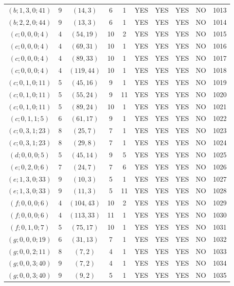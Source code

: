 \begin{longtable}{|c|c|c|c|c|c|c|c|c|c|}
$(b; 1, 3, 0; 41)$ & 9 & $(14, 3)$ & 6 & 1 & YES & YES & YES & NO & 1013\\
$(b; 2, 2, 0; 44)$ & 9 & $(13, 3)$ & 6 & 1 & YES & YES & YES & NO & 1014\\
$(c; 0, 0, 0; 4)$ & 4 & $(54, 19)$ & 10 & 2 & YES & YES & YES & NO & 1015\\
$(c; 0, 0, 0; 4)$ & 4 & $(69, 31)$ & 10 & 1 & YES & YES & YES & NO & 1016\\
$(c; 0, 0, 0; 4)$ & 4 & $(89, 33)$ & 10 & 1 & YES & YES & YES & NO & 1017\\
$(c; 0, 0, 0; 4)$ & 4 & $(119, 44)$ & 10 & 1 & YES & YES & YES & NO & 1018\\
$(c; 0, 1, 0; 11)$ & 5 & $(45, 16)$ & 9 & 1 & YES & YES & YES & NO & 1019\\
$(c; 0, 1, 0; 11)$ & 5 & $(55, 24)$ & 9 & 11 & YES & YES & YES & NO & 1020\\
$(c; 0, 1, 0; 11)$ & 5 & $(89, 24)$ & 10 & 1 & YES & YES & YES & NO & 1021\\
$(c; 0, 1, 1; 5)$ & 6 & $(61, 17)$ & 9 & 1 & YES & YES & YES & NO & 1022\\
$(c; 0, 3, 1; 23)$ & 8 & $(25, 7)$ & 7 & 1 & YES & YES & YES & NO & 1023\\
$(c; 0, 3, 1; 23)$ & 8 & $(29, 8)$ & 7 & 1 & YES & YES & YES & NO & 1024\\
$(d; 0, 0, 0; 5)$ & 5 & $(45, 14)$ & 9 & 5 & YES & YES & YES & NO & 1025\\
$(e; 0, 2, 0; 6)$ & 7 & $(24, 7)$ & 7 & 6 & YES & YES & YES & NO & 1026\\
$(e; 1, 3, 0; 33)$ & 9 & $(10, 3)$ & 5 & 1 & YES & YES & YES & NO & 1027\\
$(e; 1, 3, 0; 33)$ & 9 & $(11, 3)$ & 5 & 11 & YES & YES & YES & NO & 1028\\
$(f; 0, 0, 0; 6)$ & 4 & $(104, 43)$ & 10 & 2 & YES & YES & YES & NO & 1029\\
$(f; 0, 0, 0; 6)$ & 4 & $(113, 33)$ & 11 & 1 & YES & YES & YES & NO & 1030\\
$(f; 0, 1, 0; 7)$ & 5 & $(75, 17)$ & 10 & 1 & YES & YES & YES & NO & 1031\\
$(g; 0, 0, 0; 19)$ & 6 & $(31, 13)$ & 7 & 1 & YES & YES & YES & NO & 1032\\
$(g; 0, 0, 2; 11)$ & 8 & $(7, 2)$ & 4 & 1 & YES & YES & YES & NO & 1033\\
$(g; 0, 0, 3; 40)$ & 9 & $(7, 2)$ & 4 & 1 & YES & YES & YES & NO & 1034\\
$(g; 0, 0, 3; 40)$ & 9 & $(9, 2)$ & 5 & 1 & YES & YES & YES & NO & 1035\\

\end{longtable}
